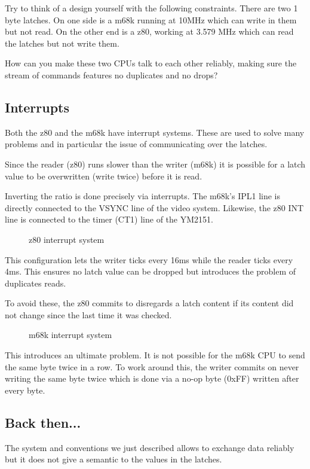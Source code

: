 Try to think of a design yourself with the following constraints. There are two 1 byte latches. On one side is a m68k running at 10MHz which can write in them but not read. On the other end is a z80, working at 3.579 MHz which can read the latches but not write them. 

How can you make these two CPUs talk to each other reliably, making sure the stream of commands features no duplicates and no drops?

\subsection{Interrupts}

Both the z80 and the m68k have interrupt systems. These are used to solve many problems and in particular the issue of communicating over the latches.

Since the reader (z80) runs slower than the writer (m68k) it is possible for a latch value to be overwritten (write twice) before it is read. 

Inverting the ratio is done precisely via interrupts. The m68k's IPL1 line is directly connected to the VSYNC line of the video system. Likewise, the z80 INT line is connected to the timer (CT1) line of the YM2151.

\begin{figure}[H]
\caption*{z80 interrupt system}
\end{figure}

This configuration lets the writer ticks every 16ms while the reader ticks every 4ms. This ensures no latch value can be dropped but introduces the problem of duplicates reads.

To avoid these, the z80 commits to disregards a latch content if its content did not change since the last time it was checked.

\begin{figure}[H]
\caption*{m68k interrupt system}
\end{figure}

This introduces an ultimate problem. It is not possible for the m68k CPU to send the same byte twice in a row. To work around this, the writer commits on never writing the same byte twice which is done via a no-op byte (0xFF) written after every byte.




\subsection{Back then...}
The system and conventions we just described allows to exchange data reliably but it does not give a semantic to the values in the latches. 


